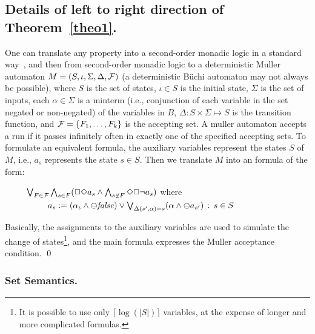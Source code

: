 \documentclass{llncs}
\begin{document}
\subsection*{Details of left to right direction of Theorem~\ref{theo1}.}
One can translate any \QLTL{} property into a second-order monadic logic in a standard
way~\cite{Thomas}, and then from
second-order monadic logic to a deterministic Muller automaton $M = (S, \iota , \Sigma, \Delta, {\cal F})$ (a deterministic B\"{u}chi automaton may not always be possible), where $S$ is the set of states, $\iota \in S$ is the initial state, $\Sigma$ is the set of inputs, each $\alpha \in \Sigma$ is a minterm (i.e., conjunction of
each variable in the set negated or non-negated) of the variables in $B$, $\Delta : S \times \Sigma \mapsto S$ is the transition function, and ${\cal F} = \{ F_1 , \ldots , F_k \}$ is the accepting set. A muller automaton 
accepts a run if it 
passes infinitely often in exactly
one of the specified accepting sets. To formulate an equivalent \ELTL{} formula,
the auxiliary variables represent the states $S$ of $M$, i.e., $a_s$ represents the state $s \in S$.
Then we translate $M$ into an \ELTL{} formula
of the form: 

\begin{tabbing}
\ \ \ \ \ $\bigvee_{F \in {\cal F}} \bigwedge_{s \in F} ( \Box\Diamond a_s \wedge \bigwedge_{s \not\in F} \Diamond \Box \neg a_s)$
where \\
\ \ \ \ \ \ \ \ \ \ $a_s :=   ( \alpha_{\iota} \wedge \ominus \mathit{false} ) \vee \bigvee_{\Delta ( s'
, \alpha ) = s } 
(\alpha \wedge \ominus a_{s'}) 
\, :\,  s \in S$
\end{tabbing}

\noindent
Basically, the assignments to the auxiliary variables are used to simulate the change of states\footnote{It is possible to use only $\lceil \log ( | S | ) \rceil$
variables, at the expense of longer and more complicated formulas.}, and the main formula expresses the Muller acceptance condition. \qed


\subsubsection*{Set Semantics.}
\end{document}

